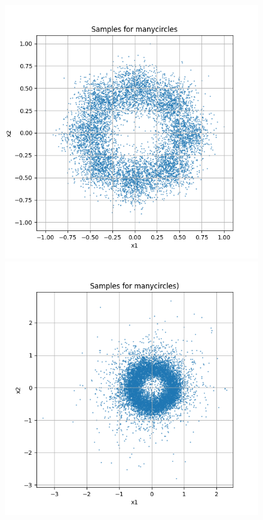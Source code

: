 \documentclass[a4paper,12pt]{article}
\begin{document}
\begin{figure}[H]
  \centering
  \begin{minipage}{0.3\textwidth}
      \centering
      \includegraphics[width=\linewidth]{images/manycircles.png}
  \end{minipage}
  \begin{minipage}{0.3\textwidth}
      \centering
      \includegraphics[width=\linewidth]{"images/Samples for ddpm_2_10_0.0001_0.02_manycircles.png"}

\end{minipage}
\end{figure}
\end{document}
